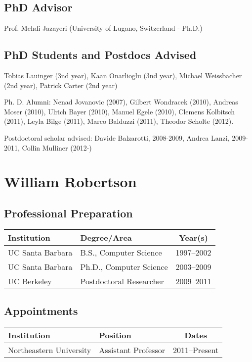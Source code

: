 \documentclass[letterpaper,twoside,11pt,headings=small]{scrartcl}
\begin{document}
\subsection*{PhD Advisor}
Prof. Mehdi Jazayeri (University of Lugano, Switzerland - Ph.D.)

\subsection*{PhD Students and Postdocs Advised}

\noindent Tobias Lauinger (3nd year), Kaan Onarlioglu (3nd
year), Michael Weissbacher (2nd year), Patrick Carter (2nd year)

\noindent Ph. D. Alumni: Nenad Jovanovic (2007), Gilbert Wondracek
(2010), Andreas Moser (2010), Ulrich Bayer (2010), Manuel Egele
(2010), Clemens Kolbitsch (2011), Leyla Bilge (2011), Marco Balduzzi
(2011), Theodor Scholte (2012).

\noindent Postdoctoral scholar advised: Davide Balzarotti, 2008-2009,
Andrea Lanzi, 2009-2011, Collin Mulliner (2012-)

\section{William Robertson}

\subsection*{Professional Preparation}

\begin{tabularx}{\textwidth}{XXc}
\toprule
\sffamily\textbf{Institution} & \sffamily\textbf{Degree/Area} &
    \sffamily\textbf{Year(s)}\\
\midrule
UC Santa Barbara & B.S., Computer Science & 1997--2002\\
UC Santa Barbara & Ph.D., Computer Science & 2003--2009\\
UC Berkeley & Postdoctoral Researcher & 2009--2011\\
\bottomrule
\end{tabularx}

\subsection*{Appointments}

\begin{tabularx}{\textwidth}{XXc}
\toprule
\sffamily\textbf{Institution} & \sffamily\textbf{Position} &
    \sffamily\textbf{Dates}\\
\midrule
Northeastern University & Assistant Professor & 2011--Present\\
\bottomrule
\end{tabularx}
\end{document}
